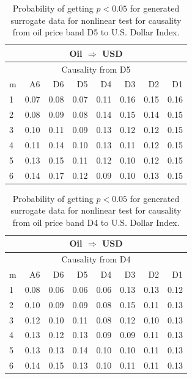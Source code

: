 %
%
\begin{table}[H]
\begin{center}
\begin{tabular}{l|r r r r r r r}
\hline\hline
\multicolumn{8}{c}{Oil $\Rightarrow$ USD}\\
\hline
\multicolumn{8}{c}{Causality from D5}\\
\hline\hline
m & A6 & D6 & D5 & D4 & D3 & D2 & D1 \\
\hline
1 & 0.07 & 0.08 & 0.07 & 0.11 & 0.16 & 0.15 & 0.16 \\
2 & 0.08 & 0.09 & 0.08 & 0.14 & 0.15 & 0.14 & 0.15 \\
3 & 0.10 & 0.11 & 0.09 & 0.13 & 0.12 & 0.12 & 0.15 \\
4 & 0.11 & 0.14 & 0.10 & 0.13 & 0.11 & 0.12 & 0.15 \\
5 & 0.13 & 0.15 & 0.11 & 0.12 & 0.10 & 0.12 & 0.15 \\
6 & 0.14 & 0.17 & 0.12 & 0.09 & 0.10 & 0.13 & 0.15 \\
\hline\hline
\end{tabular}
\caption{Probability of getting $p < 0.05$ for generated surrogate data for nonlinear test for causality from oil price band D5 to U.S. Dollar Index.}
\end{center}
\end{table}

%
%
\begin{table}[H]
\begin{center}
\begin{tabular}{l|r r r r r r r}
\hline\hline
\multicolumn{8}{c}{Oil $\Rightarrow$ USD}\\
\hline
\multicolumn{8}{c}{Causality from D4}\\
\hline\hline
m & A6 & D6 & D5 & D4 & D3 & D2 & D1 \\
\hline
1 & 0.08 & 0.06 & 0.06 & 0.06 & 0.13 & 0.13 & \cellcolor{mygrey}0.12 \\
2 & 0.10 & 0.09 & 0.09 & 0.08 & 0.15 & 0.11 & \cellcolor{mygrey}0.13 \\
3 & 0.12 & 0.10 & 0.11 & 0.08 & 0.12 & 0.10 & \cellcolor{mygrey}0.13 \\
4 & 0.13 & 0.12 & 0.13 & 0.09 & 0.09 & 0.11 & \cellcolor{mygrey}0.13 \\
5 & 0.13 & 0.13 & 0.14 & 0.10 & 0.10 & 0.11 & \cellcolor{mygrey}0.13 \\
6 & 0.14 & 0.15 & 0.13 & 0.10 & 0.11 & 0.11 & \cellcolor{mygrey}0.13 \\
\hline\hline
\end{tabular}
\caption{Probability of getting $p < 0.05$ for generated surrogate data for nonlinear test for causality from oil price band D4 to U.S. Dollar Index.}
\end{center}
\end{table}

